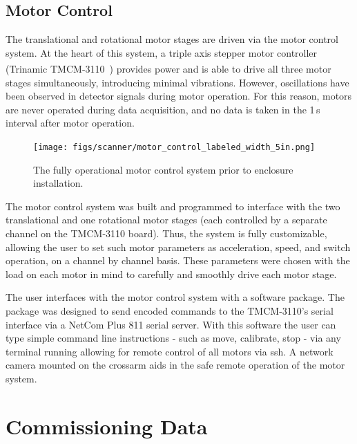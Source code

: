 \subsection{Motor Control} \label{subsec:motorcontrol}
The translational and rotational motor stages are driven via the motor control system. At the heart of this system, a triple axis stepper motor controller (Trinamic\textsuperscript{\tiny\textregistered} TMCM-3110~\cite{trinamic}) provides power and is able to drive all three motor stages simultaneously, introducing minimal vibrations. However, oscillations have been observed in detector signals during motor operation. For this reason, motors are never operated during data acquisition, and no data is taken in the 1\,s interval after motor operation. 
\begin{figure}[htb]
	\centering
	\texttt{[image: figs/scanner/motor\_control\_labeled\_width\_5in.png]}
	\caption{The fully operational motor control system prior to enclosure installation.}
	\label{fig:motorcontroller}
\end{figure}
The motor control system was built and programmed to interface with the two translational and one rotational motor stages (each controlled by a separate channel on the TMCM-3110 board). Thus, the system is fully customizable, allowing the user to set such motor parameters as acceleration, speed, and switch operation, on a channel by channel basis. These parameters were chosen with the load on each motor in mind to carefully and smoothly drive each motor stage. 

The user interfaces with the motor control system with a \julia{} software package. The package was designed to send encoded commands to the TMCM-3110's serial interface via a NetCom Plus 811 serial server. With this software the user can type simple command line instructions - such as move, calibrate, stop - via any terminal running \julia{} allowing for remote control of all motors via ssh. A network camera mounted on the crossarm aids in the safe remote operation of the motor system. 

\section{Commissioning Data}

